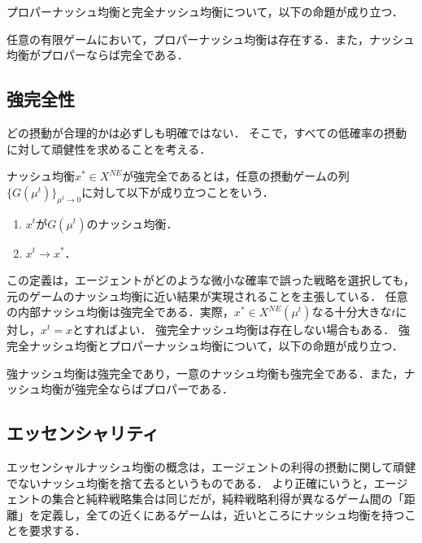 \documentclass{jsreport}
\begin{document}
プロパーナッシュ均衡と完全ナッシュ均衡について，以下の命題が成り立つ．
\begin{screen}
  \begin{prop}\label{prop:2}
    任意の有限ゲームにおいて，プロパーナッシュ均衡は存在する．また，ナッシュ均衡がプロパーならば完全である．
  \end{prop}
\end{screen}

\subsection{強完全性}
どの摂動が合理的かは必ずしも明確ではない．
そこで，すべての低確率の摂動に対して頑健性を求めることを考える．
\begin{screen}
  \begin{defi}
    ナッシュ均衡$x^{*} \in X^{NE}$が強完全であるとは，任意の摂動ゲームの列$\{G(\mu^t)\}_{\mu^t \to 0}$に対して以下が成り立つことをいう．
    \begin{enumerate}
      \item $x^t$が$G(\mu^t)$のナッシュ均衡．
      \item $x^t \to x^{*}$．
    \end{enumerate}
  \end{defi}
\end{screen}

この定義は，エージェントがどのような微小な確率で誤った戦略を選択しても，元のゲームのナッシュ均衡に近い結果が実現されることを主張している．
任意の内部ナッシュ均衡は強完全である．実際，$x^{*} \in X^{NE}(\mu^t)$なる十分大きな$t$に対し，$x^t = x$とすればよい．
強完全ナッシュ均衡は存在しない場合もある．
強完全ナッシュ均衡とプロパーナッシュ均衡について，以下の命題が成り立つ．

\begin{screen}
  \begin{prop}\label{prop:3}
    強ナッシュ均衡は強完全であり，一意のナッシュ均衡も強完全である．また，ナッシュ均衡が強完全ならばプロパーである．
  \end{prop}
\end{screen}


\subsection{エッセンシャリティ}
エッセンシャルナッシュ均衡の概念は，エージェントの利得の摂動に関して頑健でないナッシュ均衡を捨て去るというものである．
より正確にいうと，エージェントの集合と純粋戦略集合は同じだが，純粋戦略利得が異なるゲーム間の「距離」を定義し，全ての近くにあるゲームは，近いところにナッシュ均衡を持つことを要求する．
\end{document}
